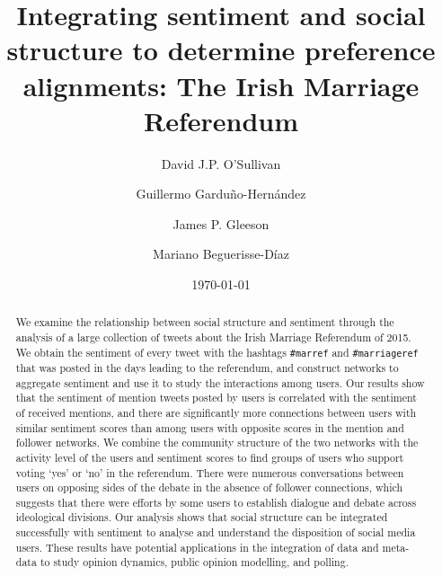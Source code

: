\documentclass{article}
\begin{document}
\title{Integrating sentiment and social structure to determine
  preference alignments: The Irish Marriage Referendum}


\author[1,*]{David J.P. O'Sullivan} \author[2]{Guillermo
  Gardu\~no-Hern\'andez} \author[1]{James P. Gleeson}
\author[3,$\dagger$]{Mariano Beguerisse-D\'iaz}
\date{\today}

\maketitle

\begin{abstract}
  We examine the relationship between social structure and sentiment
  through the analysis of a large collection of tweets about the Irish
  Marriage Referendum of 2015. We obtain the sentiment of every tweet
  with the hashtags {\tt \#marref} and {\tt \#marriageref} that was
  posted in the days leading to the referendum, and construct networks
  to aggregate sentiment and use it to study the interactions among
  users. Our results show that the sentiment of mention tweets posted
  by users is correlated with the sentiment of received mentions, and
  there are significantly more connections between users with similar
  sentiment scores than among users with opposite scores in the
  mention and follower networks. We combine the community structure of
  the two networks with the activity level of the users and sentiment
  scores to find groups of users who support voting `yes' or `no' in
  the referendum. There were numerous conversations between users on
  opposing sides of the debate in the absence of follower connections,
  which suggests that there were efforts by some users to establish
  dialogue and debate across ideological divisions. Our analysis shows
  that social structure can be integrated successfully with sentiment
  to analyse and understand the disposition of social media users.
  These results have potential applications in the integration of data
  and meta-data to study opinion dynamics, public opinion modelling,
  and polling.
\end{abstract}
\end{document}
